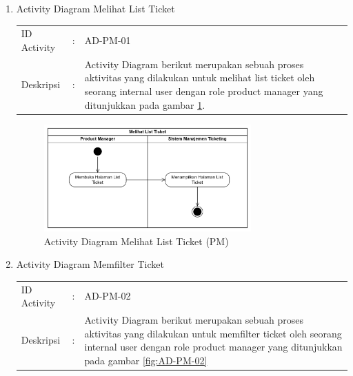 \documentclass[12pt]{article}
\begin{document}
\begin{enumerate}[label=\textbf{4.\arabic*.}]
\begin{enumerate} [label=\textbf{4.2.\arabic*.}, wide, labelwidth=!, labelindent=0pt]
\begin{enumerate}[label=\textbf{4.2.1.\arabic*.}, wide, labelwidth=!, labelindent=0pt]
            \begin{enumerate}[label=\arabic*.,wide,labelindent=27pt]
                \item Activity Diagram Melihat List Ticket
                
                \hspace*{10pt}
                \begin{tabularx}{.9\linewidth}{@{} l l X @{}}
                    ID Activity & : & AD-PM-01 \\
                    Deskripsi & : &  Activity Diagram berikut merupakan sebuah proses aktivitas yang dilakukan untuk melihat list ticket oleh seorang internal user dengan role product manager yang ditunjukkan pada gambar \ref{fig:AD-PM-01}.
                \end{tabularx}
                

                \begin{figure}[H]
                    \centering \includegraphics[width=0.75\textwidth]{images/activity/ipm/Melihat List Ticket.png}
                    \caption{Activity Diagram Melihat List Ticket (PM)}
                    \label{fig:AD-PM-01}
                \end{figure}

                \item Activity Diagram Memfilter Ticket
                
                \hspace*{10pt}
                \begin{tabularx}{.9\linewidth}{@{} l l X @{}}
                    ID Activity & : & AD-PM-02 \\
                    Deskripsi & : &  Activity Diagram berikut merupakan sebuah proses aktivitas yang dilakukan untuk memfilter ticket oleh seorang internal user dengan role product manager yang ditunjukkan pada gambar \ref{fig:AD-PM-02}
                \end{tabularx}
                

\end{enumerate}
\end{enumerate}
\end{enumerate}
\end{enumerate}
\end{document}
